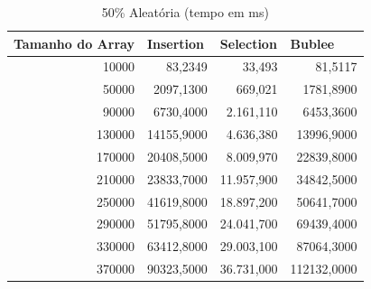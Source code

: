 \documentclass[a4paper, 12pt]{article}
\begin{document}
\begin{longtable}[c]{rrrr}
	\caption{50\% Aleatória (tempo em ms)}
	\label{tab:aleatoria501-table}\\
	\hline
	\multicolumn{1}{l}{\textbf{Tamanho do Array}} & \multicolumn{1}{l}{\textbf{Insertion}} & \multicolumn{1}{l}{\textbf{Selection}} & \multicolumn{1}{l}{\textbf{Bublee}} \\ \hline
	\endfirsthead
	\endhead
	\multicolumn{1}{|r|}{10000}                   & \multicolumn{1}{r|}{83,2349}           & \multicolumn{1}{r|}{33,493}            & \multicolumn{1}{r|}{81,5117}        \\ \hline
	\multicolumn{1}{|r|}{50000}                   & \multicolumn{1}{r|}{2097,1300}         & \multicolumn{1}{r|}{669,021}           & \multicolumn{1}{r|}{1781,8900}      \\ \hline
	\multicolumn{1}{|r|}{90000}                   & \multicolumn{1}{r|}{6730,4000}         & \multicolumn{1}{r|}{2.161,110}         & \multicolumn{1}{r|}{6453,3600}      \\ \hline
	\multicolumn{1}{|r|}{130000}                  & \multicolumn{1}{r|}{14155,9000}        & \multicolumn{1}{r|}{4.636,380}         & \multicolumn{1}{r|}{13996,9000}     \\ \hline
	\multicolumn{1}{|r|}{170000}                  & \multicolumn{1}{r|}{20408,5000}        & \multicolumn{1}{r|}{8.009,970}         & \multicolumn{1}{r|}{22839,8000}     \\ \hline
	\multicolumn{1}{|r|}{210000}                  & \multicolumn{1}{r|}{23833,7000}        & \multicolumn{1}{r|}{11.957,900}        & \multicolumn{1}{r|}{34842,5000}     \\ \hline
	\multicolumn{1}{|r|}{250000}                  & \multicolumn{1}{r|}{41619,8000}        & \multicolumn{1}{r|}{18.897,200}        & \multicolumn{1}{r|}{50641,7000}     \\ \hline
	\multicolumn{1}{|r|}{290000}                  & \multicolumn{1}{r|}{51795,8000}        & \multicolumn{1}{r|}{24.041,700}        & \multicolumn{1}{r|}{69439,4000}     \\ \hline
	\multicolumn{1}{|r|}{330000}                  & \multicolumn{1}{r|}{63412,8000}        & \multicolumn{1}{r|}{29.003,100}        & \multicolumn{1}{r|}{87064,3000}     \\ \hline
	\multicolumn{1}{|r|}{370000}                  & \multicolumn{1}{r|}{90323,5000}        & \multicolumn{1}{r|}{36.731,000}        & \multicolumn{1}{r|}{112132,0000}    \\ \hline

\end{longtable}
\end{document}
